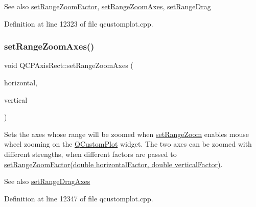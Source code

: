 \begin{DoxySeeAlso}{See also}
\hyperlink{class_q_c_p_axis_rect_a895d7ac745ea614e04056244b3c138ac}{set\+Range\+Zoom\+Factor}, \hyperlink{class_q_c_p_axis_rect_a9442cca2aa358405f39a64d51eca13d2}{set\+Range\+Zoom\+Axes}, \hyperlink{class_q_c_p_axis_rect_ae6aef2f7211ba6097c925dcd26008418}{set\+Range\+Drag} 
\end{DoxySeeAlso}


Definition at line 12323 of file qcustomplot.\+cpp.

\mbox{\label{class_q_c_p_axis_rect_a9442cca2aa358405f39a64d51eca13d2}} 
\subsubsection{\texorpdfstring{set\+Range\+Zoom\+Axes()}{setRangeZoomAxes()}}
{\footnotesize\ttfamily void Q\+C\+P\+Axis\+Rect\+::set\+Range\+Zoom\+Axes (\begin{DoxyParamCaption}\item[{\hyperlink{class_q_c_p_axis}{Q\+C\+P\+Axis} $\ast$}]{horizontal,  }\item[{\hyperlink{class_q_c_p_axis}{Q\+C\+P\+Axis} $\ast$}]{vertical }\end{DoxyParamCaption})}

Sets the axes whose range will be zoomed when \hyperlink{class_q_c_p_axis_rect_a7960a9d222f1c31d558b064b60f86a31}{set\+Range\+Zoom} enables mouse wheel zooming on the \hyperlink{class_q_custom_plot}{Q\+Custom\+Plot} widget. The two axes can be zoomed with different strengths, when different factors are passed to \hyperlink{class_q_c_p_axis_rect_a895d7ac745ea614e04056244b3c138ac}{set\+Range\+Zoom\+Factor(double horizontal\+Factor, double vertical\+Factor)}.

\begin{DoxySeeAlso}{See also}
\hyperlink{class_q_c_p_axis_rect_a648cce336bd99daac4a5ca3e5743775d}{set\+Range\+Drag\+Axes} 
\end{DoxySeeAlso}


Definition at line 12347 of file qcustomplot.\+cpp.

\mbox{\label{class_q_c_p_axis_rect_a895d7ac745ea614e04056244b3c138ac}} 
